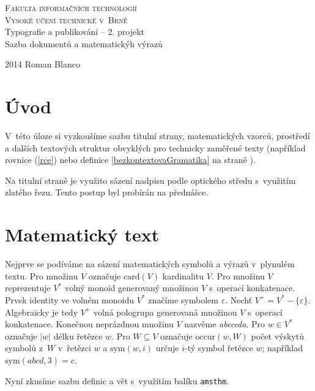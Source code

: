 \documentclass[11pt,a4paper,twocolumn]{article}
\theoremstyle{plain}
\theoremstyle{definition}
\theoremstyle{plain}
\begin{document}
  \begin{titlepage}
    \begin{center}
      \Huge
      \textsc{Fakulta informačních technologií \\ Vysoké učení technické v~Brně}
      \\[84mm]
      \LARGE{Typografie a publikování -- 2. projekt \\
             Sazba dokumentů a matematickýh výrazů}
      \vfill
    \end{center}
    \Large{2014 \hfill Roman Blanco}
  \end{titlepage}

  \section*{Úvod}

    V~této úloze si vyzkoušíme sazbu titulní strany, matematických vzorců, 
    prostředí a dalších textových struktur obvyklých pro technicky zaměřené 
    texty (například rovnice (\ref{rce}) nebo definice 
    \ref{bezkontextovaGramatika} na straně \pageref{bezkontextovaGramatika}).

    Na titulní straně je využito sázení nadpisu podle optického středu
    s~využitím zlatého řezu. Tento postup byl probírán na přednášce.

  \section{Matematický text}

    Nejprve se podíváme na sázení matematických symbolů a výrazů v~plynulém
    textu. Pro množinu $V$ označuje $\mathrm{card}(V)$ kardinalitu $V$. 
    Pro množinu $V$ reprezentuje $V^{*}$ volný monoid generovaný množinou $V$
    s~operací konkatenace.
    Prvek identity ve volném monoidu $V^{*}$ značíme symbolem $\varepsilon$.
    Nechť $V^{+}=V^{*}-\{\varepsilon\}$. Algebraicky je tedy $V^{+}$ volná 
    pologrupa generovaná množinou $V$ s~operací konkatenace.
    Konečnou neprázdnou množinu $V$ nazvěme \emph{abeceda}.
    Pro $w \in V^{*}$ označuje $|w|$ délku řetězce $w$. Pro $W \subseteq V$
    označuje $\mathrm{occur}(w,W)$ počet výskytů symbolů z~$W$ v~řetězci $w$ a
    $\mathrm{sym}(w,i)$ určuje $i$-tý symbol řetězce $w$; například
    $\mathrm{sym}(abcd,3) = c$.

    Nyní zkusíme sazbu definic a vět s~využitím balíku \texttt{amsthm}.
\end{document}
